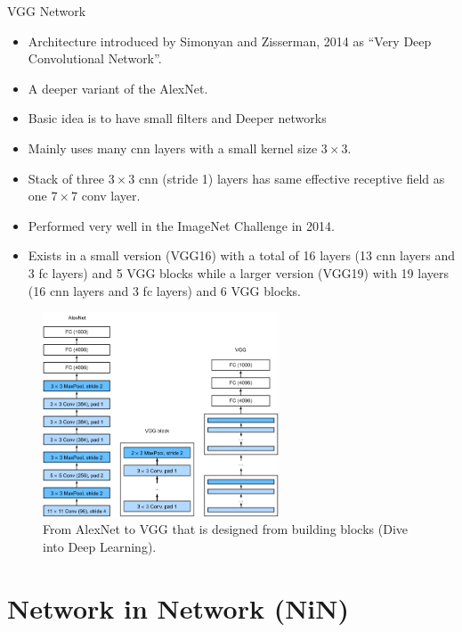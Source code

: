 \begin{vbframe}{VGG Network}
  \begin{itemize}
    \item Architecture introduced by Simonyan and Zisserman, 2014 as \enquote{Very Deep Convolutional Network}.
    \item A deeper variant of the AlexNet.
    \item Basic idea is to have small filters and Deeper networks
    \item Mainly uses many cnn layers with a small kernel size $3 \times 3$.
    \item Stack of three $3 \times 3$ cnn (stride 1) layers has same effective receptive field as one $7 \times 7$ conv layer.
    \item Performed very well in the ImageNet Challenge in 2014.
    \item Exists in a small version (VGG16) with a total of 16 layers (13 cnn layers and 3 fc layers) and 5 VGG blocks while a larger version (VGG19) with 19 layers (16 cnn layers and 3 fc layers) and 6 VGG blocks.
  \end{itemize}
\framebreak
  \begin{figure}
  \centering
    \includegraphics[width=7cm]{plots/moderncnn/vgg.png}
    \caption{From AlexNet to VGG that is designed from building blocks (Dive into Deep Learning).}
  \end{figure}

\end{vbframe}

\section{Network in Network (NiN)}


